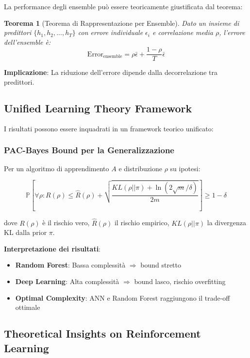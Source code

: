 \documentclass[12pt,a4paper,twoside]{report}
\newtheorem{theorem}{Teorema}[section]
\begin{document}
\begin{appendices}
La performance degli ensemble può essere teoricamente giustificata dal teorema:

\begin{theorem}[Teorema di Rappresentazione per Ensemble]
Dato un insieme di predittori $\{h_1, h_2, ..., h_T\}$ con errore individuale $\epsilon_i$ e correlazione media $\rho$, l'errore dell'ensemble è:
$$\text{Error}_{\text{ensemble}} = \rho \bar{\epsilon} + \frac{1-\rho}{T}\bar{\epsilon}$$
\end{theorem}

\textbf{Implicazione}: La riduzione dell'errore dipende dalla decorrelazione tra predittori.

\subsection{Unified Learning Theory Framework}

I risultati possono essere inquadrati in un framework teorico unificato:

\subsubsection{PAC-Bayes Bound per la Generalizzazione}

Per un algoritmo di apprendimento $A$ e distribuzione $\rho$ su ipotesi:

\begin{equation}
\mathbb{P}\left[ \forall \rho: R(\rho) \leq \hat{R}(\rho) + \sqrt{\frac{KL(\rho||\pi) + \ln(2\sqrt{m}/\delta)}{2m}} \right] \geq 1-\delta
\end{equation}

dove $R(\rho)$ è il rischio vero, $\hat{R}(\rho)$ il rischio empirico, $KL(\rho||\pi)$ la divergenza KL dalla prior $\pi$.

\textbf{Interpretazione dei risultati}:
\begin{itemize}
    \item \textbf{Random Forest}: Bassa complessità $\Rightarrow$ bound stretto
    \item \textbf{Deep Learning}: Alta complessità $\Rightarrow$ bound lasco, rischio overfitting
    \item \textbf{Optimal Complexity}: ANN e Random Forest raggiungono il trade-off ottimale
\end{itemize}

\subsection{Theoretical Insights on Reinforcement Learning}


\end{appendices}
\end{document}
